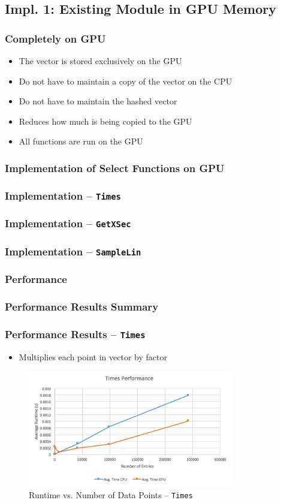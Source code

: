\documentclass{beamer}
\newcommand\pro{\item[$+$]}
\newcommand\con{\item[$-$]}
\begin{document}
\subsection{Impl. 1: Existing Module in GPU Memory}
\begin{frame}
\frametitle{Completely on GPU}
\begin{itemize}
\item The vector is stored exclusively on the GPU
\pro Do not have to maintain a copy of the vector on the CPU
\pro Do not have to maintain the hashed vector
\pro Reduces how much is being copied to the GPU
\con All functions are run on the GPU
\end{itemize}
\end{frame}

\subsubsection{Implementation of Select Functions on GPU}
\begin{frame}
\frametitle{Implementation -- \texttt{Times}}
\end{frame}

\begin{frame}
\frametitle{Implementation -- \texttt{GetXSec}}
\end{frame}

\begin{frame}
\frametitle{Implementation -- \texttt{SampleLin}}
\end{frame}

\subsubsection{Performance}
\begin{frame}
\frametitle{Performance Results Summary}
\end{frame}

\begin{frame}
\frametitle{Performance Results -- \texttt{Times}}
\begin{itemize}
\item Multiplies each point in vector by factor
\end{itemize}
\begin{figure}
\centering
\includegraphics[width=0.8\textwidth]{images/times_line.png}
\caption{Runtime vs. Number of Data Points -- \texttt{Times}}
\end{figure}
\end{frame}
\end{document}
